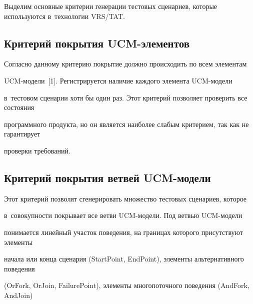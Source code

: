 \vspace*{-2pt}



  Выделим основные критерии генерации тестовых сценариев, которые используются в~технологии VRS/TAT.



  \vspace*{-3pt}



\subsection{Критерий покрытия UCM-элементов}



\vspace*{-2pt}



  Согласно данному критерию покрытие должно происходить по всем элементам

  UCM-мо\-де\-ли~[1]. Регистрируется наличие каждого элемента UCM-мо\-де\-ли

в~тестовом сценарии хотя бы один раз. Этот критерий позволяет проверить все состояния

программного продукта, но он является наиболее слабым критерием, так как не гарантирует

проверки требований.



\vspace*{-3pt}



\subsection{Критерий покрытия ветвей UCM-модели}



\vspace*{-2pt}



  Этот критерий позволят сгенерировать множество тестовых сценариев, которое

в~совокупности покрывает все ветви UCM-мо\-де\-ли. Под ветвью UCM-мо\-де\-ли

понимается линейный участок поведения, на границах которого присутствуют элементы

начала или конца сценария (StartPoint, EndPoint), элементы альтернативного поведения

(OrFork, OrJoin, FailurePoint), элементы многопоточного поведения (AndFork, AndJoin)

